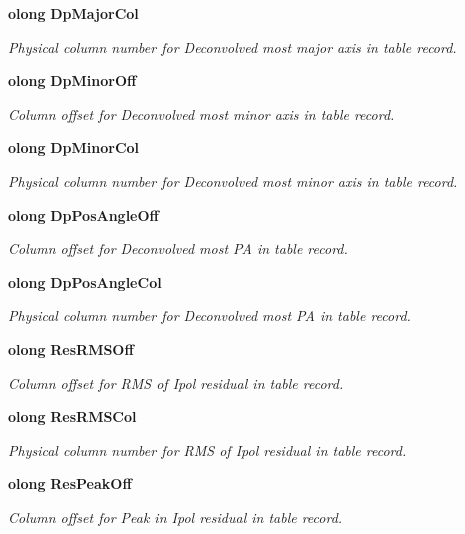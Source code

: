 \begin{CompactItemize}
{\bf olong} {\bf Dp\-Major\-Col}
\begin{CompactList}\small\item\em Physical column number for Deconvolved most major axis in table record. \item\end{CompactList}\item 
{\bf olong} {\bf Dp\-Minor\-Off}
\begin{CompactList}\small\item\em Column offset for Deconvolved most minor axis in table record. \item\end{CompactList}\item 
{\bf olong} {\bf Dp\-Minor\-Col}
\begin{CompactList}\small\item\em Physical column number for Deconvolved most minor axis in table record. \item\end{CompactList}\item 
{\bf olong} {\bf Dp\-Pos\-Angle\-Off}
\begin{CompactList}\small\item\em Column offset for Deconvolved most PA in table record. \item\end{CompactList}\item 
{\bf olong} {\bf Dp\-Pos\-Angle\-Col}
\begin{CompactList}\small\item\em Physical column number for Deconvolved most PA in table record. \item\end{CompactList}\item 
{\bf olong} {\bf Res\-RMSOff}
\begin{CompactList}\small\item\em Column offset for RMS of Ipol residual in table record. \item\end{CompactList}\item 
{\bf olong} {\bf Res\-RMSCol}
\begin{CompactList}\small\item\em Physical column number for RMS of Ipol residual in table record. \item\end{CompactList}\item 
{\bf olong} {\bf Res\-Peak\-Off}
\begin{CompactList}\small\item\em Column offset for Peak in Ipol residual in table record. \item\end{CompactList}\item 

\end{CompactItemize}

